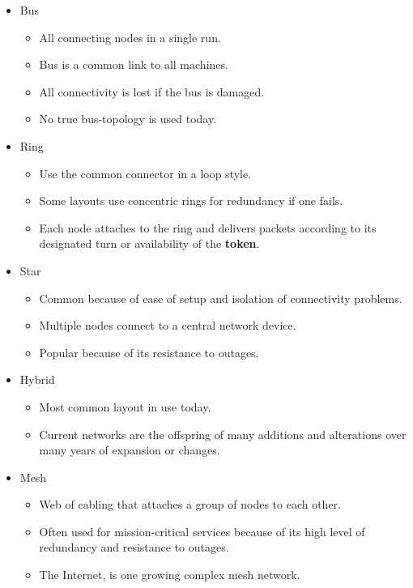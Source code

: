 \begin{itemize}
    \item Bus
    \begin{itemize}
        \item All connecting nodes in a single run.
        \item Bus is a common link to all machines.
        \item All connectivity is lost if the bus is damaged.
        \item No true bus-topology is used today.
    \end{itemize}
    \item Ring
    \begin{itemize}
        \item Use the common connector in a loop style.
        \item Some layouts use concentric rings for redundancy if one fails.
        \item Each node attaches to the ring and delivers packets according to its designated turn or availability of the \textbf{token}.
    \end{itemize}
    \item Star
    \begin{itemize}
        \item Common because of ease of setup and isolation of connectivity problems.
        \item Multiple nodes connect to a central network device.
        \item Popular because of its resistance to outages.
    \end{itemize}
    \item Hybrid
    \begin{itemize}
        \item Most common layout in use today.
        \item Current networks are the offspring of many additions and alterations over many years of expansion or changes. 
    \end{itemize}
    \item Mesh
    \begin{itemize}
        \item Web of cabling that attaches a group of nodes to each other.
        \item Often used for mission-critical services because of its high level of redundancy and resistance to outages.
        \item The Internet, is one growing complex mesh network.
    \end{itemize}
\end{itemize}

